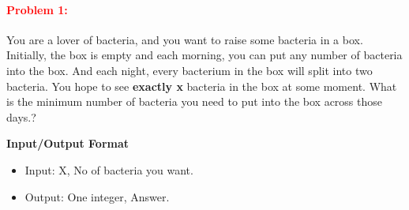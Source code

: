 \documentclass[a4paper,11pt]{article} %
\begin{document}








\newpage
\paragraph{\textcolor{red}{Problem 1:}}
You are a lover of bacteria, and you want to raise some bacteria in a box. Initially, the box is empty and each morning, you can put any number of bacteria into the box. And each night, every bacterium in the box will split into two bacteria. You hope to see \textbf{exactly x} bacteria in the box at some moment.
What is the minimum number of bacteria you need to put into the box across those days.?

\vspace*{0.5cm}

\textbf{Input/Output Format}
\begin{itemize}
    \item  Input: X, No of bacteria you want.
    \item  Output: One integer, Answer.
\end{itemize}
\end{document}
